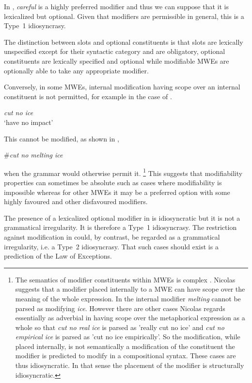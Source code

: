 \documentclass[output=paper]{langsci/langscibook}
\begin{document}
In , \textit{careful} is a highly preferred modifier and thus we can suppose that it is lexicalized but optional. Given that modifiers are permissible in general, this is a Type~1 idiosyncrasy.

The distinction between slots and optional constituents is that slots are lexically unspecified except for their syntactic category and are obligatory, optional constituents are lexically specified and optional while modifiable MWEs are optionally able to take any appropriate modifier.

Conversely, in some MWEs, internal modification having scope over an internal constituent is not permitted, for example in the case of .

\begin{exe}
\ex\label{ex:ex36} \textit{cut no ice}\\
‘have no impact’
\end{exe}



This cannot be modified, as shown in ,

\begin{exe}
\ex\label{ex:ex37} \#\textit{cut no melting ice}
\end{exe}

\noindent
when the grammar would otherwise permit it.%
\footnote{The semantics of modifier constituents within MWEs is complex \citep{Nicolas1995}. Nicolas suggests that a modifier 
placed internally to a MWE can have scope over the meaning of the whole 
expression. In  the internal modifier \textit{melting} 
cannot be parsed as modifying \textit{ice}. However there are other cases 
Nicolas regards essentially as adverbial in having scope over the 
metaphorical expression as a whole so that \textit{cut no real ice} is 
parsed as  'really cut no ice' and \textit{cut no empirical ice} is parsed 
as\textit{} 'cut no ice empirically'. So the modification, while placed 
internally, is not semantically a modification of the constituent the 
modifier is predicted to modify in a compositional syntax. These cases are 
thus idiosyncratic. In that sense the placement of the modifier is 
structurally idiosyncratic.} 
This suggests that modifiability properties 
can sometimes be absolute such as cases where modifiability is impossible 
whereas for other MWEs it may be a preferred option with some highly 
favoured and other disfavoured modifiers. 

The presence of a lexicalized optional modifier in  is idiosyncratic but it is not a grammatical irregularity. It is therefore a Type~1 idiosyncrasy. The restriction against modification in  could, by contrast, be regarded as a grammatical irregularity, i.e. a Type~2 idiosyncrasy. That such cases should exist is a prediction of the Law of Exceptions. 
\end{document}
